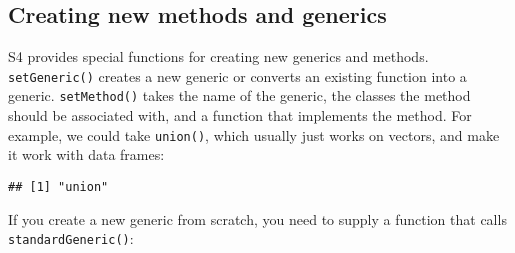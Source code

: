 \hypertarget{creating-new-methods-and-generics-1}{%
\subsection{Creating new methods and
generics}\label{creating-new-methods-and-generics-1}}

S4 provides special functions for creating new generics and methods.
\texttt{setGeneric()} creates a new generic or converts an existing
function into a generic. \texttt{setMethod()} takes the name of the
generic, the classes the method should be associated with, and a
function that implements the method. For example, we could take
\texttt{union()}, which usually just works on vectors, and make it work
with data frames:  
 

\begin{Shaded}
\begin{Highlighting}[]
\NormalTok{(}\NormalTok{)}
\end{Highlighting}
\end{Shaded}

\begin{verbatim}
## [1] "union"
\end{verbatim}

\begin{Shaded}
\begin{Highlighting}[]
\NormalTok{(}\NormalTok{,}
  \NormalTok{(} \NormalTok{, } \NormalTok{),}
    \NormalTok{(}
\NormalTok{  \}}
\NormalTok{)}
\end{Highlighting}
\end{Shaded}

If you create a new generic from scratch, you need to supply a function
that calls \texttt{standardGeneric()}:

\begin{Shaded}
\begin{Highlighting}[]
\NormalTok{(}\NormalTok{, }
  \NormalTok{(}\NormalTok{)}
\NormalTok{\})}
\end{Highlighting}
\end{Shaded}

